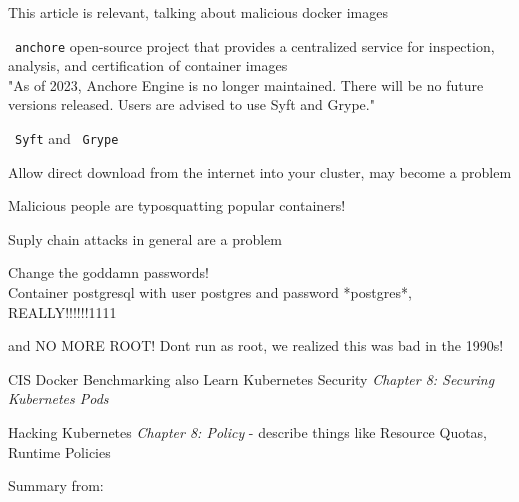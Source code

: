 \documentclass[Screen16to9,17pt]{foils}
\begin{document}

This article is relevant, talking about malicious docker images\\


\begin{list2}
\item \faWrench\ \verb+anchore+ open-source project that provides a centralized service for inspection, analysis, and certification of container images
\\
"As of 2023, Anchore Engine is no longer maintained. There will be no future versions released. Users are advised to use Syft and Grype."
\item \faWrench\ \verb+Syft+  and \faWrench\ \verb+Grype+ 
\item Allow direct download from the internet into your cluster, may become a problem
\item Malicious people are typosquatting popular containers!
\item Suply chain attacks in general are a problem
\end{list2}


\begin{list2}
\item Change the goddamn passwords!\\
Container postgresql with user postgres and password *postgres*, REALLY!!!!!!1111
\item and NO MORE ROOT! Dont run as root, we realized this was bad in the 1990s!
\item CIS Docker Benchmarking also Learn Kubernetes Security \emph{Chapter 8: Securing Kubernetes Pods}
\item Hacking Kubernetes \emph{Chapter 8: Policy} - describe things like Resource Quotas, Runtime Policies
\end{list2}


Summary from: 
\end{document}
